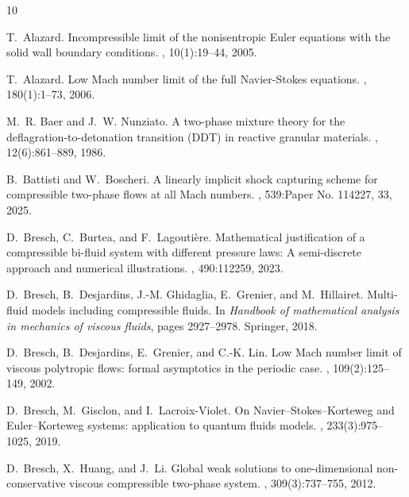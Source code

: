 \documentclass[11pt, twoside, a4paper]{article}
\theoremstyle{plain}
\theoremstyle{remark}
\numberwithin{equation}{section}
\begin{document}
\begin{thebibliography}{10}

T.~Alazard.
\newblock Incompressible limit of the nonisentropic {E}uler equations with the
  solid wall boundary conditions.
, 10(1):19--44, 2005.

T.~Alazard.
\newblock Low {M}ach number limit of the full {N}avier-{S}tokes equations.
, 180(1):1--73, 2006.

M.~R. Baer and J.~W. Nunziato.
\newblock A two-phase mixture theory for the deflagration-to-detonation
  transition ({DDT}) in reactive granular materials.
, 12(6):861--889, 1986.

B.~Battisti and W.~Boscheri.
\newblock A linearly implicit shock capturing scheme for compressible two-phase
  flows at all {M}ach numbers.
, 539:Paper No. 114227, 33, 2025.

D.~Bresch, C.~Burtea, and F.~Lagouti{\`e}re.
\newblock Mathematical justification of a compressible bi-fluid system with
  different pressure laws: {A} semi-discrete approach and numerical
  illustrations.
, 490:112259, 2023.

D.~Bresch, B.~Desjardins, J.-M. Ghidaglia, E.~Grenier, and M.~Hillairet.
\newblock Multi-fluid models including compressible fluids.
\newblock In {\em Handbook of mathematical analysis in mechanics of viscous
  fluids}, pages 2927--2978. Springer, 2018.

D.~Bresch, B.~Desjardins, E.~Grenier, and C.-K. Lin.
\newblock Low {M}ach number limit of viscous polytropic flows: formal
  asymptotics in the periodic case.
, 109(2):125--149, 2002.

D.~Bresch, M.~Gisclon, and I.~Lacroix-Violet.
\newblock On {N}avier--{S}tokes--{K}orteweg and {E}uler--{K}orteweg systems:
  application to quantum fluids models.
, 233(3):975--1025, 2019.

D.~Bresch, X.~Huang, and J.~Li.
\newblock Global weak solutions to one-dimensional non-conservative viscous
  compressible two-phase system.
, 309(3):737--755, 2012.


\end{thebibliography}
\end{document}

